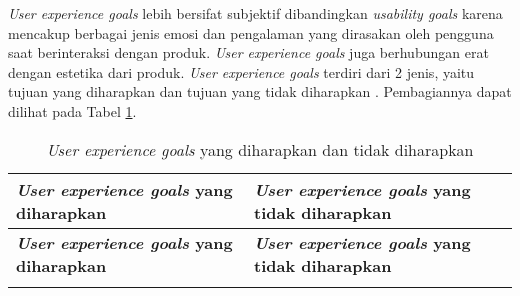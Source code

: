 \textit{User experience goals} lebih bersifat subjektif dibandingkan \textit{usability goals} karena mencakup berbagai jenis emosi dan pengalaman yang dirasakan oleh pengguna saat berinteraksi dengan produk. \textit{User experience goals} juga berhubungan erat dengan estetika dari produk. \textit{User experience goals} terdiri dari 2 jenis, yaitu tujuan yang diharapkan dan tujuan yang tidak diharapkan \parencite{PreeceRogersSharp15}. Pembagiannya dapat dilihat pada Tabel \ref{tab:ux_goals}.

\newpage

\RaggedLeft
\begin{footnotesize}
\begin{longtable}[c]{|>{\cbnormspacing}m{}|>{\cbnormspacing}m{}|}
  \caption{\textit{User experience goals} yang diharapkan dan tidak diharapkan}
  \label{tab:ux_goals} \\
  \hline \rowcolor[HTML]{A3E5F5}
  \centering\textbf{\textit{User experience goals} yang diharapkan} & \textbf{\textit{User experience goals} yang tidak diharapkan} \\ \hline \endfirsthead
  \hline \rowcolor[HTML]{A3E5F5}
  \centering\textbf{\textit{User experience goals} yang diharapkan} & \textbf{\textit{User experience goals} yang tidak diharapkan} \\ \hline \endhead
  
  \hline \endfoot
  

\end{longtable}
\end{footnotesize}
